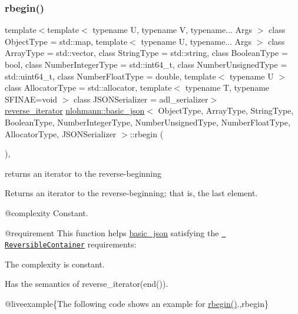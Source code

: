 \subsubsection{\texorpdfstring{rbegin()}{rbegin()}\hspace{0.1cm}{\footnotesize\ttfamily [1/2]}}
{\footnotesize\ttfamily template$<$template$<$ typename U, typename V, typename... Args $>$ class Object\+Type = std\+::map, template$<$ typename U, typename... Args $>$ class Array\+Type = std\+::vector, class String\+Type  = std\+::string, class Boolean\+Type  = bool, class Number\+Integer\+Type  = std\+::int64\+\_\+t, class Number\+Unsigned\+Type  = std\+::uint64\+\_\+t, class Number\+Float\+Type  = double, template$<$ typename U $>$ class Allocator\+Type = std\+::allocator, template$<$ typename T, typename S\+F\+I\+N\+A\+E=void $>$ class J\+S\+O\+N\+Serializer = adl\+\_\+serializer$>$ \\
\mbox{\hyperlink{classnlohmann_1_1basic__json_ac223d5560c2b05a208c88de67376c5f2}{reverse\+\_\+iterator}} \mbox{\hyperlink{classnlohmann_1_1basic__json}{nlohmann\+::basic\+\_\+json}}$<$ Object\+Type, Array\+Type, String\+Type, Boolean\+Type, Number\+Integer\+Type, Number\+Unsigned\+Type, Number\+Float\+Type, Allocator\+Type, J\+S\+O\+N\+Serializer $>$\+::rbegin (\begin{DoxyParamCaption}{ }\end{DoxyParamCaption})\hspace{0.3cm}{\ttfamily [inline]}, {\ttfamily [noexcept]}}



returns an iterator to the reverse-\/beginning 

Returns an iterator to the reverse-\/beginning; that is, the last element.

 @complexity Constant.

@requirement This function helps {\ttfamily \mbox{\hyperlink{classnlohmann_1_1basic__json}{basic\+\_\+json}}} satisfying the \href{http://en.cppreference.com/w/cpp/concept/ReversibleContainer}{\texttt{ Reversible\+Container}} requirements\+:
\begin{DoxyItemize}
\item The complexity is constant.
\item Has the semantics of {\ttfamily reverse\+\_\+iterator(end())}.
\end{DoxyItemize}

@liveexample\{The following code shows an example for {\ttfamily \mbox{\hyperlink{classnlohmann_1_1basic__json_a1ef93e2006dbe52667294f5ef38b0b10}{rbegin()}}}.,rbegin\}

